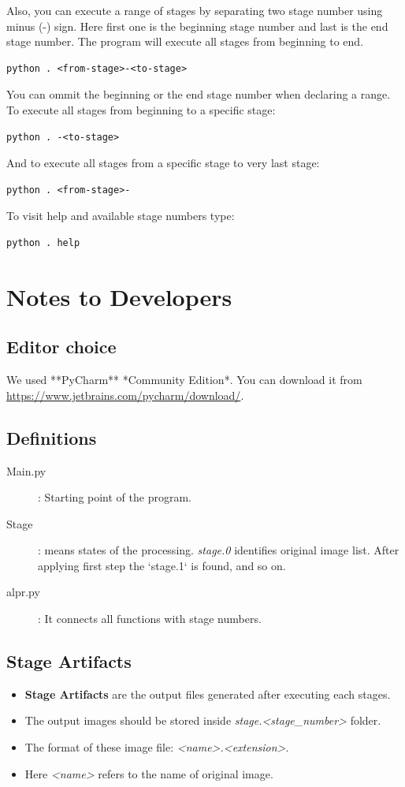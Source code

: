 Also, you can execute a range of stages by separating two stage number using minus (-) sign. Here first one is the beginning stage number and last is the end stage number. The program will execute all stages from beginning to end. 
\begin{lstlisting}
python . <from-stage>-<to-stage>
\end{lstlisting}

You can ommit the beginning or the end stage number when declaring a range. To execute all stages from beginning to a specific stage:
\begin{lstlisting}
python . -<to-stage>
\end{lstlisting}

And to execute all stages from a specific stage to very last stage:
\begin{lstlisting}
python . <from-stage>-
\end{lstlisting}

To visit help and available stage numbers type:
\begin{lstlisting}
python . help
\end{lstlisting}


\section{Notes to Developers}
\subsection{Editor choice}
We used **PyCharm** *Community Edition*. You can download it from \url{https://www.jetbrains.com/pycharm/download/}.

\subsection{Definitions}
\begin{description}
    \item[Main.py]: Starting point of the program.
    \item[Stage]: means states of the processing. {\it stage.0} identifies original image list.
 After applying first step the `stage.1` is found, and so on.
    \item[alpr.py]: It connects all functions with stage numbers.    
\end{description}

\subsection{Stage Artifacts}
\begin{itemize}
    \item {\bf Stage Artifacts} are the output files generated after executing each stages.
    \item The output images should be stored inside {\it stage.<stage\_number>} folder.
    \item The format of these image file: {\it <name>.<extension>}. 
    \item Here {\it <name>} refers to the name of original image.
\end{itemize}

